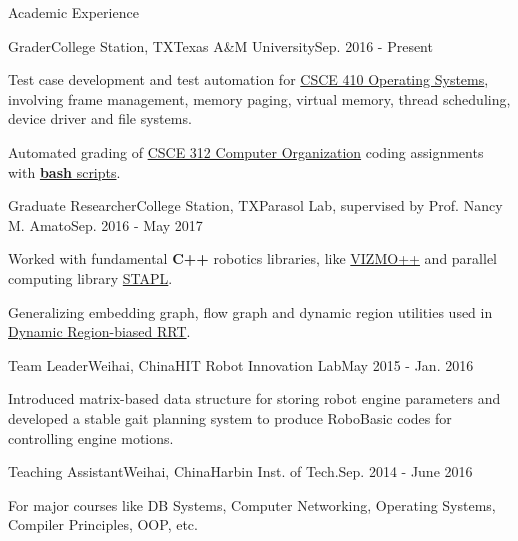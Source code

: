 \documentclass{resume} %
\begin{document}

\begin{rSection}{Academic Experience}
\begin{rSubsection}{Grader}{College Station, TX}{Texas A\&M University}{Sep. 2016 - Present}
\item Test case development and test automation for \href{http://faculty.cse.tamu.edu/dilma/web-csce410-fall16/index.htm}{CSCE 410 Operating Systems}, involving frame management, memory paging, virtual memory, thread scheduling, device driver and file systems.
\item Automated grading of \href{http://faculty.cse.tamu.edu/djimenez/312/}{CSCE 312 Computer Organization} coding assignments with \href{https://github.com/tamu-csce312/hw-test}{\textbf{bash} scripts}.
\end{rSubsection}

\begin{rSubsection}{Graduate Researcher}{College Station, TX}{Parasol Lab, supervised by Prof. Nancy M. Amato}{Sep. 2016 - May 2017}
\item Worked with fundamental \textbf{C++} robotics libraries, like \href{https://parasol.tamu.edu/groups/amatogroup/research/UserGuided/Old/vizmo++/}{VIZMO++} and parallel computing library \href{https://parasol.tamu.edu/groups/rwergergroup/research/stapl/}{STAPL}.
\item Generalizing embedding graph, flow graph and dynamic region utilities used in \href{http://wafr2016.berkeley.edu/papers/WAFR_2016_paper_36.pdf}{Dynamic Region-biased RRT}.
\end{rSubsection}

\begin{rSubsection}{Team Leader}{Weihai, China}{HIT Robot Innovation Lab}{May 2015 - Jan. 2016}
\item Introduced matrix-based data structure for storing robot engine parameters and developed a stable gait planning system to produce RoboBasic codes for controlling engine motions.
\end{rSubsection}

\begin{rSubsection}{Teaching Assistant}{Weihai, China}{Harbin Inst. of Tech.}{Sep. 2014 - June 2016}
\item For major courses like DB Systems, Computer Networking, Operating Systems, Compiler Principles, OOP, etc.
\end{rSubsection}
\end{rSection}
\end{document}
